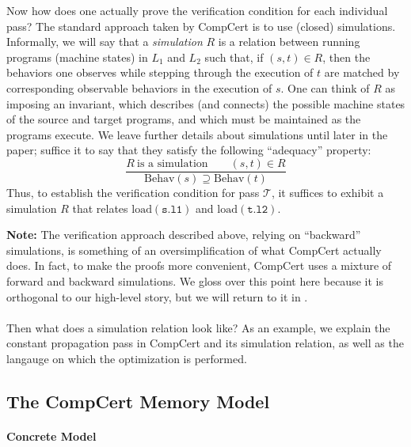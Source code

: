 Now how does one actually prove the verification condition for each individual pass?  The standard
approach taken by CompCert is to use (closed) simulations.  Informally, we will say that a
\emph{simulation} $R$ is a relation between running programs (\ie machine states) in $L_1$ and $L_2$
such that, if $(s,t) \in R$, then the behaviors one observes while stepping through the execution of
$t$ are matched by corresponding observable behaviors in the execution of $s$.  One can think of $R$
as imposing an invariant, which describes (and connects) the possible machine states of the source
and target programs, and which must be maintained as the programs execute.  We leave further details
about simulations until later in the paper; suffice it to say that they satisfy the following
``adequacy'' property:
\[
\frac{
R~\mbox{is a simulation} \qquad
(s,t)\in R
}{
\mathrm{Behav}(s) \supseteq \mathrm{Behav}(t)
}
\]
Thus, to establish the verification condition for pass $\mathcal{T}$, it suffices to exhibit a
simulation $R$ that relates $\mathrm{load}(\mathtt{s.l1})$ and $\mathrm{load}(\mathtt{t.l2})$.

\textbf{Note:} The verification approach described above, relying on ``backward'' simulations, is
something of an oversimplification of what CompCert actually does.  In fact, to make the proofs more
convenient, CompCert uses a mixture of forward and backward simulations.  We gloss over this point
here because it is orthogonal to our high-level story, but we will return to it in
.


\paragraph*{}

Then what does a simulation relation look like?  As an example, we explain the constant propagation
pass in CompCert and its simulation relation, as well as the langauge on which the optimization is
performed.


\subsection{The CompCert Memory Model}
\label{sec:background:memory}

\paragraph{Concrete Model}

